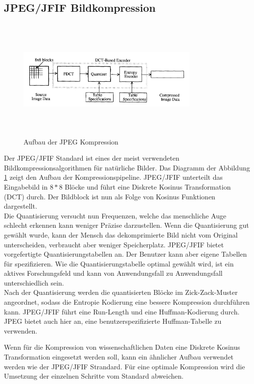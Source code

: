 \subsection{JPEG/JFIF Bildkompression}
\begin{figure}[!htbp]
	\center
	\includegraphics[width=0.8\textwidth,height=6cm,keepaspectratio]{./pictures/state/jpeg.png}
	\caption{Aufbau der JPEG Kompression \cite{wallace1992jpeg}}
	\label{state:jpeg:abb}
\end{figure}
Der JPEG/JFIF Standard ist eines der meist verwendeten Bildkompressionsalgorithmen für natürliche Bilder. Das Diagramm der Abbildung \ref{state:jpeg:abb} zeigt den Aufbau der Kompressionspipeline. JPEG/JFIF unterteilt das Eingabebild in $8*8$ Blöcke und führt eine Diskrete Kosinus Transformation (DCT) durch. Der Bildblock ist nun als Folge von Kosinus Funktionen dargestellt.\\
Die Quantisierung versucht nun Frequenzen, welche das menschliche Auge schlecht erkennen kann weniger Präzise darzustellen. Wenn die Quantisierung gut gewählt wurde, kann der Mensch das dekomprimierte Bild nicht vom Original unterscheiden, verbraucht aber weniger Speicherplatz. JPEG/JFIF bietet vorgefertigte Quantisierungstabellen an. Der Benutzer kann aber eigene Tabellen für spezifizieren. Wie die Quantisierungstabelle optimal gewählt wird, ist ein aktives Forschungsfeld \cite{wu1993rate:jpeg} \cite{wang2001designing:jpeg} und kann von Anwendungsfall zu Anwendungsfall unterschiedlich sein.\\
Nach der Quantisierung werden die quantisierten Blöcke im Zick-Zack-Muster angeordnet, sodass die Entropie Kodierung eine bessere Kompression durchführen kann. JPEG/JFIF führt eine Run-Length\cite{wiki:rle} und eine Huffman-Kodierung\cite{huffman1952method} durch. JPEG bietet auch hier an, eine benutzerspezifizierte Huffman-Tabelle zu verwenden.

Wenn für die Kompression von wissenschaftlichen Daten eine Diskrete Kosinus Transformation eingesetzt werden soll, kann ein ähnlicher Aufbau verwendet werden wie der JPEG/JFIF Strandard. Für eine optimale Kompression wird die Umsetzung der einzelnen Schritte vom Standard abweichen.


